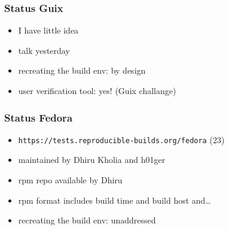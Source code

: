 \documentclass[14pt]{beamer}
\begin{document}
\begin{frame}
 \frametitle{Status Guix}
 \begin{itemize}
  \item I have little idea
  \item talk yesterday
  \item recreating the build env: by design
  \item user verification tool: yes! (Guix challange)
 \end{itemize}
\end{frame}


\begin{frame}
 \frametitle{Status Fedora}
 \begin{itemize}
  \item \texttt{https://tests.reproducible-builds.org/fedora} (23)
  \item maintained by Dhiru Kholia and h01ger
  \item rpm repo available by Dhiru
  \item rpm format includes build time and build host and…
  \item recreating the build env: unaddressed
 \end{itemize}
\end{frame}
\end{document}
